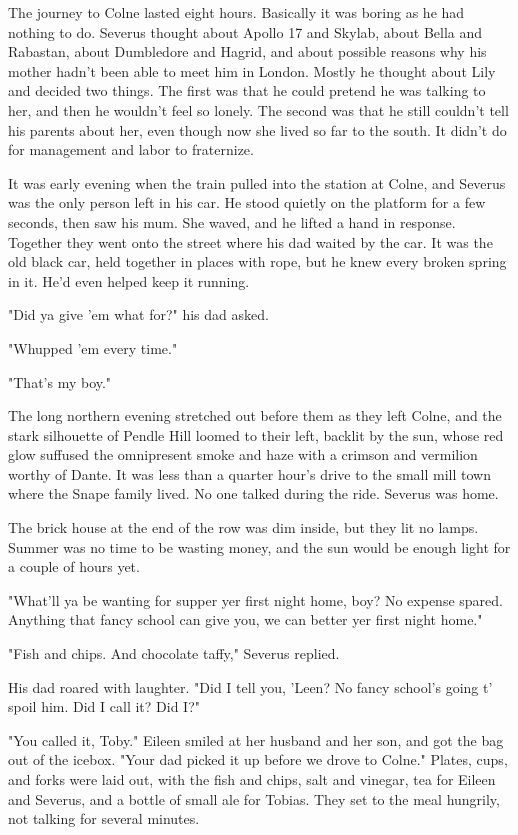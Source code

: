 \documentclass[a4paper,11pt]{article}
\begin{document}
The journey to Colne lasted eight hours. Basically it was boring as he had nothing to do. Severus thought about Apollo 17 and Skylab, about Bella and Rabastan, about Dumbledore and Hagrid, and about possible reasons why his mother hadn't been able to meet him in London. Mostly he thought about Lily and decided two things. The first was that he could pretend he was talking to her, and then he wouldn't feel so lonely. The second was that he still couldn't tell his parents about her, even though now she lived so far to the south. It didn't do for management and labor to fraternize.

It was early evening when the train pulled into the station at Colne, and Severus was the only person left in his car. He stood quietly on the platform for a few seconds, then saw his mum. She waved, and he lifted a hand in response. Together they went onto the street where his dad waited by the car. It was the old black car, held together in places with rope, but he knew every broken spring in it. He'd even helped keep it running.

"Did ya give 'em what for?" his dad asked.

"Whupped 'em every time."

"That's my boy."

The long northern evening stretched out before them as they left Colne, and the stark silhouette of Pendle Hill loomed to their left, backlit by the sun, whose red glow suffused the omnipresent smoke and haze with a crimson and vermilion worthy of Dante. It was less than a quarter hour's drive to the small mill town where the Snape family lived. No one talked during the ride. Severus was home.

The brick house at the end of the row was dim inside, but they lit no lamps. Summer was no time to be wasting money, and the sun would be enough light for a couple of hours yet.

"What'll ya be wanting for supper yer first night home, boy? No expense spared. Anything that fancy school can give you, we can better yer first night home."

"Fish and chips. And chocolate taffy," Severus replied.

His dad roared with laughter. "Did I tell you, 'Leen? No fancy school's going t' spoil him. Did I call it? Did I?"

"You called it, Toby." Eileen smiled at her husband and her son, and got the bag out of the icebox. "Your dad picked it up before we drove to Colne." Plates, cups, and forks were laid out, with the fish and chips, salt and vinegar, tea for Eileen and Severus, and a bottle of small ale for Tobias. They set to the meal hungrily, not talking for several minutes.
\end{document}
